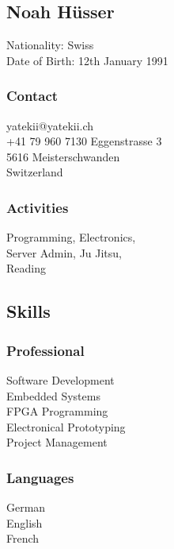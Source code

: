 \documentclass[]{resume}
\begin{document}

\begin{facts}
\section{Noah Hüsser}
\sectionsep
\sectionsep

Nationality: Swiss\\
Date of Birth: 12th January 1991
\sectionsep

\subsubsection{Contact}
yatekii@yatekii.ch\\
+41 79 960 7130
Eggenstrasse 3\\
5616 Meisterschwanden\\
Switzerland
\sectionsep

\subsubsection{Activities}
Programming, Electronics,\\
Server Admin, Ju Jitsu,\\
Reading
\sectionsep


\subsection{Skills}

\subsubsection{Professional}
Software Development\\
Embedded Systems\\
FPGA Programming\\
Electronical Prototyping\\
Project Management
\sectionsep

\subsubsection{Languages}
German \\
English \\
French 
\sectionsep


\end{facts}
\end{document}
